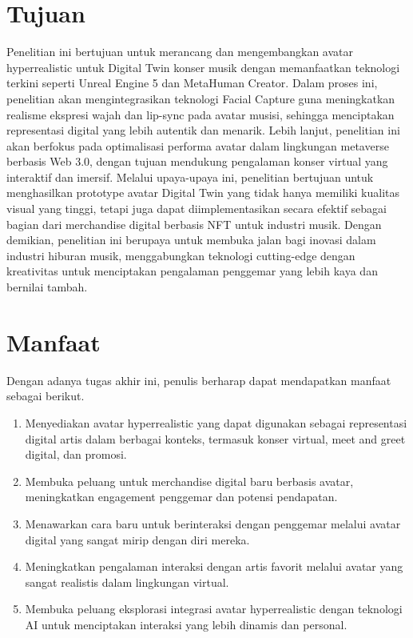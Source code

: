 \section{Tujuan}


Penelitian ini bertujuan untuk merancang dan mengembangkan avatar hyperrealistic untuk Digital Twin konser musik dengan memanfaatkan
teknologi terkini seperti Unreal Engine 5 dan MetaHuman Creator. Dalam proses ini, penelitian akan mengintegrasikan teknologi Facial
Capture guna meningkatkan realisme ekspresi wajah dan lip-sync pada avatar musisi, sehingga menciptakan representasi digital yang 
lebih autentik dan menarik. Lebih lanjut, penelitian ini akan berfokus pada optimalisasi performa avatar dalam lingkungan metaverse 
berbasis Web 3.0, dengan tujuan mendukung pengalaman konser virtual yang interaktif dan imersif. Melalui upaya-upaya ini, penelitian 
bertujuan untuk menghasilkan prototype avatar Digital Twin yang tidak hanya memiliki kualitas visual yang tinggi, tetapi juga dapat 
diimplementasikan secara efektif sebagai bagian dari merchandise digital berbasis NFT untuk industri musik. Dengan demikian, 
penelitian ini berupaya untuk membuka jalan bagi inovasi dalam industri hiburan musik, menggabungkan teknologi cutting-edge dengan 
kreativitas untuk menciptakan pengalaman penggemar yang lebih kaya dan bernilai tambah.

\section{Manfaat}
Dengan adanya tugas akhir ini, penulis berharap dapat mendapatkan manfaat sebagai berikut.

\begin{enumerate}
    \item Menyediakan avatar hyperrealistic yang dapat digunakan sebagai representasi digital artis dalam berbagai konteks, termasuk konser virtual, meet and greet digital, dan promosi.
    \item Membuka peluang untuk merchandise digital baru berbasis avatar, meningkatkan engagement penggemar dan potensi pendapatan.
    \item Menawarkan cara baru untuk berinteraksi dengan penggemar melalui avatar digital yang sangat mirip dengan diri mereka.
    \item Meningkatkan pengalaman interaksi dengan artis favorit melalui avatar yang sangat realistis dalam lingkungan virtual.
    \item Membuka peluang eksplorasi integrasi avatar hyperrealistic dengan teknologi AI untuk menciptakan interaksi yang lebih dinamis dan personal.
\end{enumerate}

